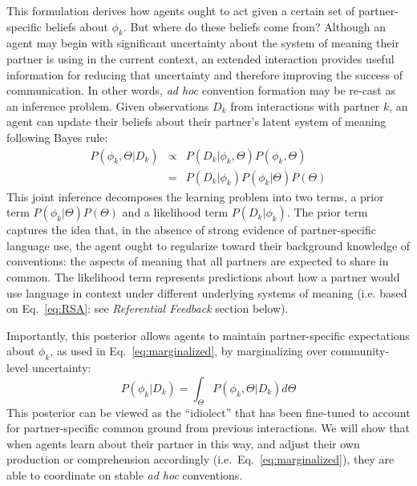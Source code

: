 This formulation derives how agents ought to act given a certain set of partner-specific beliefs about $\phi_k$.
But where do these beliefs come from?
Although an agent may begin with significant uncertainty about the system of meaning their partner is using in the current context, an extended interaction provides useful information for reducing that uncertainty and therefore improving the success of communication.
In other words, \emph{ad hoc} convention formation may be re-cast as an inference problem.
Given observations $D_k$ from interactions with partner $k$, an agent can update their beliefs about their partner's latent system of meaning following Bayes rule:
\begin{equation}
\begin{array}{rcl}
\label{eq:joint_inference}
P(\phi_k, \Theta | D_k)  & \propto &  P(D_k | \phi_k, \Theta) P(\phi_k, \Theta) \\
                           & =   & P(D_k | \phi_k) P(\phi_k | \Theta) P(\Theta)
\end{array}
\end{equation}
This joint inference decomposes the learning problem into two terms, a prior term $P(\phi_k | \Theta)P(\Theta)$ and a likelihood term $P(D_k | \phi_k)$.
The prior term captures the idea that, in the absence of strong evidence of partner-specific language use, the agent ought to regularize toward their background knowledge of conventions: the aspects of meaning that all partners are expected to share in common.
The likelihood term represents predictions about how a partner would use language in context under different underlying systems of meaning (i.e. based on Eq.~\ref{eq:RSA}: see \emph{Referential Feedback} section below).

Importantly, this posterior allows agents to maintain partner-specific expectations about $\phi_k$, as used in Eq.~\ref{eq:marginalized}, by marginalizing over community-level uncertainty:
\begin{equation}
P(\phi_k | D_k) =  \int_{\Theta}P(\phi_k, \Theta | D_k)  d\Theta
\end{equation}
This posterior can be viewed as the ``idiolect'' that has been fine-tuned to account for partner-specific common ground from previous interactions.
We will show that when agents learn about their partner in this way, and adjust their own production or comprehension accordingly (i.e.~Eq.~\ref{eq:marginalized}), they are able to coordinate on stable \emph{ad hoc} conventions.


